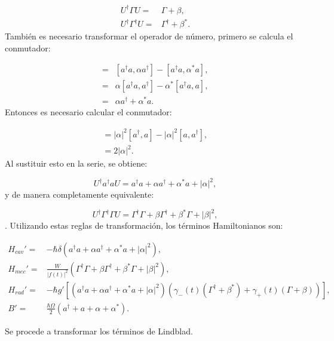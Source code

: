 \documentclass[a4paper,10pt]{report}
\begin{document}
\begin{align}
U^{\dagger}\Gamma U =& \Gamma + \beta, \\
U^{\dagger}\Gamma^\dagger U =& \Gamma^\dagger + \beta^*.
\end{align} También es necesario transformar el operador de número, primero se calcula el conmutador:

\begin{align*}
[a^\dagger a,(\alpha a^\dagger - \alpha^*a) ] =& [a^\dagger a,\alpha a^\dagger] - [a^\dagger a,\alpha^*a],\\
=&\alpha [a^\dagger a,a^\dagger] - \alpha^*[a^\dagger a,a],\\
=&\alpha a^{\dagger} + \alpha^* a.
\end{align*} Entonces es necesario calcular el conmutador:

\begin{align*}
[\alpha a^{\dagger} + \alpha^* a,\alpha a^\dagger - \alpha^*a] = |\alpha|^2[a^{\dagger},a]-|\alpha|^2[a,a^{\dagger}],\\
=2|\alpha|^2.
\end{align*} Al sustituir esto en la serie, se obtiene:

\begin{equation}
U^\dagger a^\dagger a U = a^\dagger a +\alpha a^\dagger + \alpha^* a + |\alpha|^2,
\end{equation} y de manera completamente equivalente:

\begin{equation}
U^\dagger \Gamma^\dagger \Gamma U = \Gamma^\dagger \Gamma +\beta \Gamma^\dagger + \beta^* \Gamma + |\beta|^2,
\end{equation}. Utilizando estas reglas de transformación, los términos Hamiltonianos son:

\begin{align}
H_{cav}' =& -\hbar \delta(a^{\dagger}a +\alpha a^{\dagger}+\alpha^* a + |\alpha|^2),\\
H_{mec}' =& \frac{W}{|f(t)|^2}(\Gamma^{\dagger}\Gamma + \beta \Gamma^{\dagger} + \beta^* \Gamma + |\beta|^2 ),\\
H_{rad}'=&-\hbar g'[(a^{\dagger}a +\alpha a^{\dagger}+\alpha^* a + |\alpha|^2)(\gamma_-(t)(\Gamma^{\dagger}+\beta^*)+\gamma_+(t)(\Gamma+\beta))],\\
B' =& \frac{\hbar \Omega}{2}(a^{\dagger} + a +\alpha + \alpha^*).
\end{align}

Se procede a transformar los términos de Lindblad.
\end{document}
